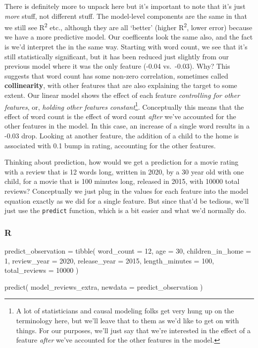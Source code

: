 \documentclass[
  letterpaper,
]{krantz}
\newenvironment{Shaded}{}{}
\newcommand{\AttributeTok}[1]{\textcolor[rgb]{0.49,0.56,0.16}{#1}}
\newcommand{\DecValTok}[1]{\textcolor[rgb]{0.25,0.63,0.44}{#1}}
\newcommand{\FunctionTok}[1]{\textcolor[rgb]{0.02,0.16,0.49}{#1}}
\newcommand{\NormalTok}[1]{#1}
\newcommand{\OtherTok}[1]{\textcolor[rgb]{0.00,0.44,0.13}{#1}}
\begin{document}
There is definitely more to unpack here but it's important to note that
it's just \emph{more} stuff, not different stuff. The model-level
components are the same in that we still see R\textsuperscript{2} etc.,
although they are all `better' (higher R\textsuperscript{2}, lower
error) because we have a more predictive model. Our coefficents look the
same also, and the fact is we'd interpret the in the same way. Starting
with word count, we see that it's still statistically significant, but
it has been reduced just slightly from our previous model where it was
the only feature (-0.04 vs.~-0.03). Why? This suggests that word count
has some non-zero correlation, sometimes called \textbf{collinearity},
with other features that are also explaining the target to some extent.
Our linear model shows the effect of each feature \emph{controlling for
other features}, or, \emph{holding other features constant}\footnote{A
  lot of statisticians and causal modeling folks get very hung up on the
  terminology here, but we'll leave that to them as we'd like to get on
  with things. For our purposes, we'll just say that we're interested in
  the effect of a feature \emph{after} we've accounted for the other
  features in the model.}. Conceptually this means that the effect of
word count is the effect of word count \emph{after} we've accounted for
the other features in the model. In this case, an increase of a single
word results in a -0.03 drop. Looking at another feature, the addition
of a child to the home is associated with 0.1 bump in rating, accounting
for the other features.

Thinking about prediction, how would we get a prediction for a movie
rating with a review that is 12 words long, written in 2020, by a 30
year old with one child, for a movie that is 100 minutes long, released
in 2015, with 10000 total reviews? Conceptually we just plug in the
values for each feature into the model equation exactly as we did for a
single feature. But since that'd be tedious, we'll just use the
\texttt{predict} function, which is a bit easier and what we'd normally
do.

\subsubsection{R}

\begin{Shaded}
\begin{Highlighting}[]
\NormalTok{predict\_observation }\OtherTok{=} \FunctionTok{tibble}\NormalTok{(}
    \AttributeTok{word\_count =} \DecValTok{12}\NormalTok{,}
    \AttributeTok{age =} \DecValTok{30}\NormalTok{,}
    \AttributeTok{children\_in\_home =} \DecValTok{1}\NormalTok{,}
    \AttributeTok{review\_year =} \DecValTok{2020}\NormalTok{,}
    \AttributeTok{release\_year =} \DecValTok{2015}\NormalTok{,}
    \AttributeTok{length\_minutes =} \DecValTok{100}\NormalTok{,}
    \AttributeTok{total\_reviews =} \DecValTok{10000}
\NormalTok{)}

\FunctionTok{predict}\NormalTok{(}
\NormalTok{    model\_reviews\_extra,}
    \AttributeTok{newdata =}\NormalTok{ predict\_observation}
\NormalTok{)}
\end{Highlighting}
\end{Shaded}
\end{document}
